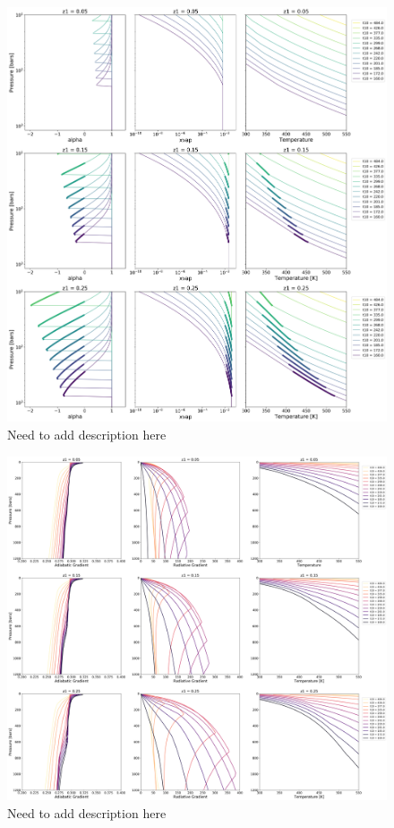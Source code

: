 \documentclass[11pt]{ucscthesisbs}
\begin{document}
\begin{figure}[ht!]
 \centerline{
  \includegraphics[width=7.0in]{figures/convection_inhibited_2.png}
 }
\caption[Inhibition of convection on Uranus]
{Need to add description here }
\label{fig:uranus}
\end{figure}
\begin{figure}[ht!]
 \centerline{
  \includegraphics[width=7.0in]{figures/radiative_plots_1.png}
 }
\caption[Inhibition of convection on Neptune]
{Need to add description here }
\label{fig:neptune}
\end{figure}
\end{document}
